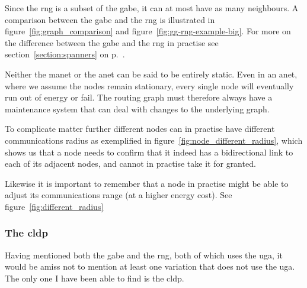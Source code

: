 Since the \ac{rng} is a subset of the \ac{gabe}, it can at most have as many neighbours. A comparison between the \ac{gabe} and the \ac{rng} is illustrated in figure~\ref{fig:graph_comparison} and figure~\ref{fig:gg-rng-example-big}. For more on the difference between the \ac{gabe} and the \ac{rng} in practise see section~\ref{section:spanners} on p.~\pageref{section:spanners}.


Neither the \ac{manet} or the \ac{anet} can be said to be entirely static. Even in an \ac{anet}, where we assume the nodes remain stationary, every single node will eventually run out of energy or fail. The routing graph must therefore always have a maintenance system that can deal with changes to the underlying graph. 

To complicate matter further different nodes can in practise have different communications radius as exemplified in figure~\ref{fig:node_different_radius}, which shows us that a node needs to confirm that it indeed has a bidirectional link to each of its adjacent nodes, and cannot in practise take it for granted.


Likewise it is important to remember that a node in practise might be able to adjust its communications range (at a higher energy cost). See figure~\ref{fig:different_radius}

\subsubsection{The \ac{cldp}}
Having mentioned both the \ac{gabe} and the \ac{rng}, both of which uses the \ac{uga}, it would be amiss not to mention at least one variation that does not use the \ac{uga}. The only one I have been able to find is the \ac{cldp}.
 

